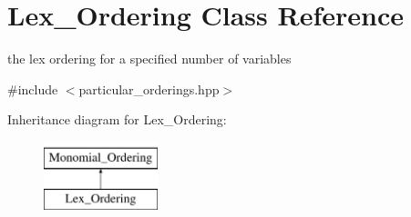 \hypertarget{class_lex___ordering}{}\section{Lex\+\_\+\+Ordering Class Reference}
\label{class_lex___ordering}


the lex ordering for a specified number of variables  




{\ttfamily \#include $<$particular\+\_\+orderings.\+hpp$>$}

Inheritance diagram for Lex\+\_\+\+Ordering\+:\begin{figure}[H]
\begin{center}
\leavevmode
\includegraphics[height=2.000000cm]{class_lex___ordering}
\end{center}
\end{figure}
